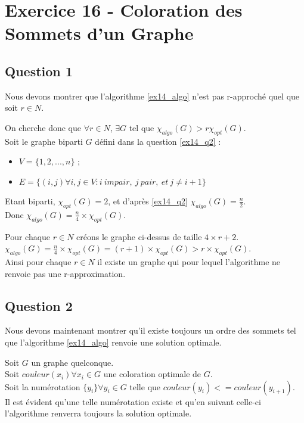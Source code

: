 
\section{Exercice 16 - Coloration des Sommets d'un Graphe}\label{ex16}

\subsection{Question 1}\label{ex16_q1}
Nous devons montrer que l'algorithme \ref{ex14_algo} n'est pas r-approch\'e quel que soit
$r \in N$.

On cherche donc que $\forall r \in N$, $\exists G$ tel que $\chi_{algo}(G) >
r\chi_{opt}(G)$.\\
Soit le graphe biparti $G$ d\'efini dans la question \ref{ex14_q2} :
\begin{itemize}
	\item $V = \{1,2,...,n\}$ ;
	\item $E = \{(i,j) \forall i,j \in V : i\ impair,\ j\ pair,\ et\ j \neq i+1\}$
\end{itemize}
Etant biparti, $\chi_{opt}(G) = 2$, et d'apr\`es \ref{ex14_q2} $\chi_{algo}(G) = \frac{n}{2}$.\\
Donc $\chi_{algo}(G) = \frac{n}{4} \times \chi_{opt}(G)$.

Pour chaque $r \in N$ cr\'eons le graphe ci-dessus de taille $4 \times r + 2$.\\
$\chi_{algo}(G) = \frac{n}{4} \times \chi_{opt}(G) = (r + 1) \times \chi_{opt}(G) > r
\times \chi_{opt}(G)$.\\
Ainsi pour chaque $r \in N$ il existe un graphe qui pour lequel l'algorithme ne renvoie
pas une r-approximation.

\subsection{Question 2}\label{ex16_q2}
Nous devons maintenant montrer qu'il existe toujours un ordre des sommets tel que
l'algorithme \ref{ex14_algo} renvoie une solution optimale.

Soit $G$ un graphe quelconque.\\
Soit $couleur(x_i) \forall x_i \in G$ une coloration optimale de $G$.\\
Soit la num\'erotation $\{y_i\} \forall y_i \in G$ telle que $couleur(y_i) <=
couleur(y_{i+1})$.\\
Il est \'evident qu'une telle num\'erotation existe et qu'en suivant celle-ci
l'algorithme renverra toujours la solution optimale.

